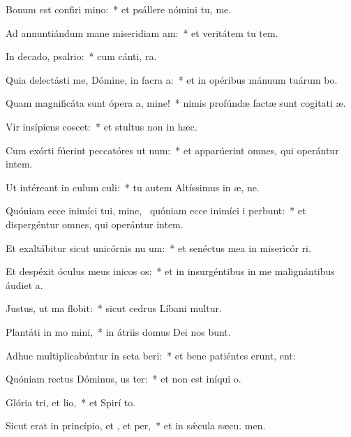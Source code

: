 \item Bonum est confiri mino:~* et psállere nómini tu, me.
\item Ad annuntiándum mane miseridiam am:~* et veritátem tu  tem.
\item In decado, psalrio:~* cum cánti,  ra.
\item Quia delectásti me, Dómine, in facra a:~* et in opéribus mánuum tuárum bo.
\item Quam magnificáta sunt ópera a, mine!~* nimis profúndæ factæ sunt cogitati æ.
\item Vir insípiens  coscet:~* et stultus non in hæc.
\item Cum exórti fúerint peccatóres ut num:~* et apparúerint omnes, qui operántur intem.
\item Ut intéreant in culum culi:~* tu autem Altíssimus in æ, ne.
\item Quóniam ecce inimíci tui, mine,~\pscross{} quóniam ecce inimíci i perbunt:~* et dispergéntur omnes, qui operántur intem.
\item Et exaltábitur sicut unicórnis nu um:~* et senéctus mea in misericór ri.
\item Et despéxit óculus meus inicos os:~* et in insurgéntibus in me malignántibus áudiet  a.
\item Justus, ut ma flobit:~* sicut cedrus Líbani multur.
\item Plantáti in mo mini,~* in átriis domus Dei nos bunt.
\item Adhuc multiplicabúntur in seta beri:~* et bene patiéntes erunt,  ent:
\item Quóniam rectus Dóminus, us ter:~* et non est iníqui  o.
\item Glória tri, et lio,~* et Spirí to.
\item Sicut erat in princípio, et , et per,~* et in sǽcula sæcu. men.
